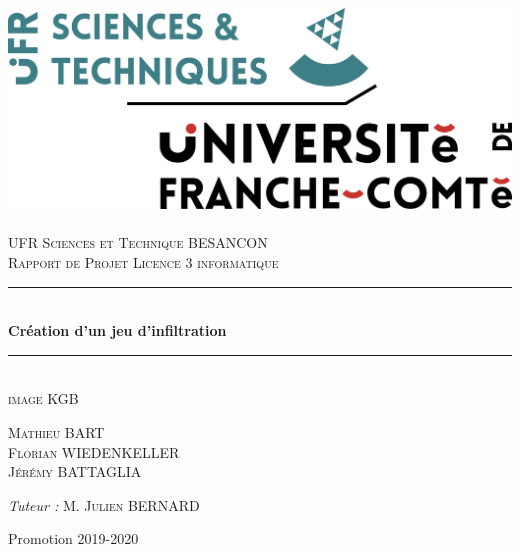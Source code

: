 \documentclass{article}
\newcommand{\VSpace}{\vspace{1.5cm}}
\newcommand{\HRule}{\rule{\linewidth}{0.5mm}}
\begin{document}
\begin{titlepage}
    \begin{sffamily}
        \begin{center}
        
            \includegraphics[scale=0.3]{images/LOGO ST.png}~\\
            \VSpace
            \textsc{\LARGE UFR Sciences et Technique BESANCON}\\
            \vspace{0.5cm}
            \textsc{\Large Rapport de Projet Licence 3 informatique}\\
            \VSpace
            \HRule\\{\huge\bfseries  Création d'un jeu d'infiltration\\}
            \HRule\\
            \VSpace
            \textsc{image KGB}
            \VSpace
    
            \begin{minipage}{0.5\textwidth}
              \begin{flushleft} \large
                \textsc{Mathieu} BART\\
                \textsc{Florian} WIEDENKELLER\\
                \textsc{Jérémy} BATTAGLIA\\
                
              \end{flushleft}
            \end{minipage}
            \begin{minipage}{0.4\textwidth}
              \begin{flushright} \large
                \emph{Tuteur :} M. \textsc{Julien} BERNARD\\
              \end{flushright}
            \end{minipage}
            \vfill
        
            {\large Promotion 2019-2020}
        \end{center}
    \end{sffamily}
\end{titlepage}
\end{document}
